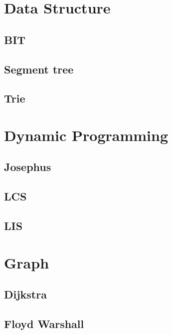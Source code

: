 \section{Data Structure}
        \subsection{BIT}
                
        \subsection{Segment tree}
                
        \subsection{Trie}
                

\section{Dynamic Programming}
        \subsection{Josephus}
                
        \subsection{LCS}
                
        \subsection{LIS}
                

\section{Graph}
        \subsection{Dijkstra}
                
        \subsection{Floyd Warshall}
                
